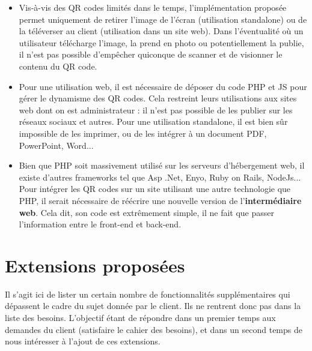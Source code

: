 \documentclass[a4paper,12pt]{article}
\begin{document}
\begin{itemize}

  \item Vis-à-vis des QR codes limités dans le temps, l'implémentation proposée permet uniquement de retirer l'image de l'écran (utilisation standalone) ou de la téléverser au client (utilisation dans un site web). Dans l'éventualité où un utilisateur télécharge l'image, la prend en photo ou potentiellement la publie, il n'est pas possible d'empêcher quiconque de scanner et de visionner le contenu du QR code.\\
  
  \item Pour une utilisation web, il est nécessaire de déposer du code PHP et JS pour gérer le dynamisme des QR codes. Cela restreint leurs utilisations aux sites web dont on est administrateur : il n'est pas possible de les publier sur les réseaux sociaux et autres. Pour une utilisation standalone, il est bien sûr impossible de les imprimer, ou de les intégrer à un document PDF, PowerPoint, Word...\\
  
  \item Bien que PHP soit massivement utilisé sur les serveurs d'hébergement web, il existe d'autres frameworks tel que Asp .Net, Enyo, Ruby on Rails, NodeJs... Pour intégrer les QR codes sur un site utilisant une autre technologie que PHP, il serait nécessaire de réécrire une nouvelle version de l'\textbf{intermédiaire web}. Cela dit, son code est extrêmement simple, il ne fait que passer l'information entre le front-end et back-end.\\
  
\end{itemize}

\newpage
\fi



\section{Extensions proposées}
\label{ExtensionsProposées}

\begin{flushleft}
Il s'agit ici de lister un certain nombre de fonctionnalités supplémentaires qui dépassent le cadre du sujet donnée par le client. Ils ne rentrent donc pas dans la liste des besoins. L'objectif étant de répondre dans un premier temps aux demandes du client (satisfaire le cahier des besoins), et dans un second temps de nous intéresser à l'ajout de ces extensions.\\
\end{flushleft}
\end{document}
